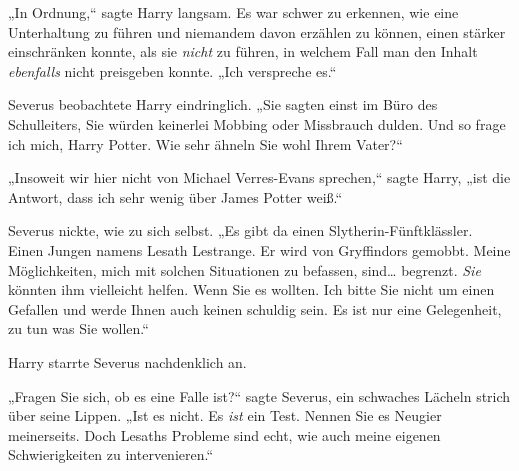 „In Ordnung,“ sagte Harry langsam. Es war schwer zu erkennen, wie eine Unterhaltung zu führen und niemandem davon erzählen zu können, einen stärker einschränken konnte, als sie \emph{nicht} zu führen, in welchem Fall man den Inhalt \emph{ebenfalls} nicht preisgeben konnte. „Ich verspreche es.“

Severus beobachtete Harry eindringlich. „Sie sagten einst im Büro des Schulleiters, Sie würden keinerlei Mobbing oder Missbrauch dulden. Und so frage ich mich, Harry Potter. Wie sehr ähneln Sie wohl Ihrem Vater?“

„Insoweit wir hier nicht von Michael Verres-Evans sprechen,“ sagte Harry, „ist die Antwort, dass ich sehr wenig über James Potter weiß.“

Severus nickte, wie zu sich selbst. „Es gibt da einen Slytherin-Fünftklässler. Einen Jungen namens Lesath Lestrange. Er wird von Gryffindors gemobbt. Meine Möglichkeiten, mich mit solchen Situationen zu befassen, sind… begrenzt. \emph{Sie} könnten ihm vielleicht helfen. Wenn Sie es wollten. Ich bitte Sie nicht um einen Gefallen und werde Ihnen auch keinen schuldig sein. Es ist nur eine Gelegenheit, zu tun was Sie wollen.“

Harry starrte Severus nachdenklich an.

„Fragen Sie sich, ob es eine Falle ist?“ sagte Severus, ein schwaches Lächeln strich über seine Lippen. „Ist es nicht. Es \emph{ist} ein Test. Nennen Sie es Neugier meinerseits. Doch Lesaths Probleme sind echt, wie auch meine eigenen Schwierigkeiten zu intervenieren.“

